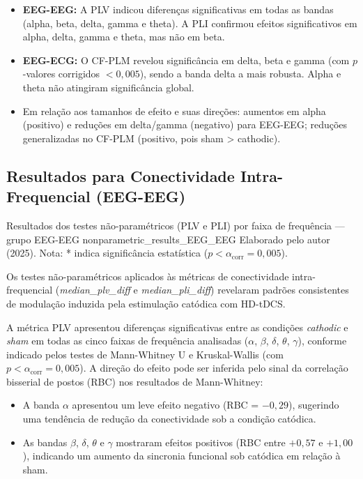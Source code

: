 \begin{itemize}
  \item \textbf{EEG-EEG:} A PLV indicou diferenças significativas em todas as bandas (alpha, beta, delta, gamma e theta). A PLI confirmou efeitos significativos em alpha, delta, gamma e theta, mas não em beta.
  \item \textbf{EEG-ECG:} O CF-PLM revelou significância em delta, beta e gamma (com $p$-valores corrigidos $< 0{,}005$), sendo a banda delta a mais robusta. Alpha e theta não atingiram significância global.
  \item Em relação aos tamanhos de efeito e suas direções: aumentos em alpha (positivo) e reduções em delta/gamma (negativo) para EEG-EEG; reduções generalizadas no CF-PLM (positivo, pois sham > cathodic).
\end{itemize}

\subsection{Resultados para Conectividade Intra-Frequencial (EEG-EEG)}

{Resultados dos testes não-paramétricos (PLV e PLI) por faixa de frequência — grupo EEG-EEG}
{nonparametric_results_EEG_EEG}
{Elaborado pelo autor (2025). Nota: * indica significância estatística ($p < \alpha_{\mathrm{corr}}=0{,}005$).}

Os testes não-paramétricos aplicados às métricas de conectividade intra-frequencial (\textit{median\_plv\_diff} e \textit{median\_pli\_diff}) revelaram padrões consistentes de modulação induzida pela estimulação catódica com HD-tDCS.

A métrica PLV apresentou diferenças significativas entre as condições \textit{cathodic} e \textit{sham} em todas as cinco faixas de frequência analisadas ($\alpha$, $\beta$, $\delta$, $\theta$, $\gamma$), conforme indicado pelos testes de Mann-Whitney U e Kruskal-Wallis (com $p < \alpha_{\mathrm{corr}}=0{,}005$). A direção do efeito pode ser inferida pelo sinal da correlação bisserial de postos (RBC) nos resultados de Mann-Whitney:
\begin{itemize}
  \item A banda $\alpha$ apresentou um leve efeito negativo (RBC = $-0{,}29$), sugerindo uma tendência de redução da conectividade sob a condição catódica.
  \item As bandas $\beta$, $\delta$, $\theta$ e $\gamma$ mostraram efeitos positivos (RBC entre $+0{,}57$ e $+1{,}00$), indicando um aumento da sincronia funcional sob catódica em relação à sham.
\end{itemize}

